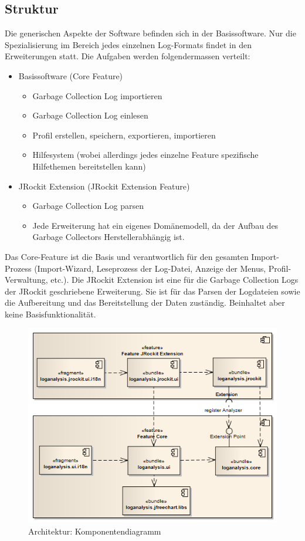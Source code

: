 \subsection{Struktur}\label{projektstruktur}
Die generischen Aspekte der Software befinden sich in der Basissoftware. Nur die Spezialisierung im Bereich jedes einzelnen Log-Formats findet in den Erweiterungen statt. Die Aufgaben werden folgendermassen verteilt:
\begin{itemize}
	\item Basissoftware (Core Feature)
		\begin{itemize}
			\item Garbage Collection Log importieren
			\item Garbage Collection Log einlesen
			\item Profil erstellen, speichern, exportieren, importieren
			\item Hilfesystem (wobei allerdings jedes einzelne Feature spezifische Hilfethemen bereitstellen kann)
		\end{itemize}
	\item JRockit Extension (JRockit Extension Feature)
		\begin{itemize}
			\item Garbage Collection Log parsen
			\item Jede Erweiterung hat ein eigenes Domänemodell, da der Aufbau des Garbage Collectors Herstellerabhängig ist.
		\end{itemize}
\end{itemize}

Das Core-Feature ist die Basis und verantwortlich für den gesamten Import-Prozess (Import-Wizard, Leseprozess der Log-Datei, Anzeige der Menus, Profil-Verwaltung, etc.). Die JRockit Extension ist eine für die Garbage Collection Logs der JRockit geschriebene Erweiterung. Sie ist für das Parsen der Logdateien sowie die Aufbereitung und das Bereitstellung der Daten zuständig. Beinhaltet aber keine Basisfunktionalität.
 \begin{figure}[H]
  	\centering
    	\includegraphics[width=14cm]{images/architektur_komponenten_uebersicht}
        	\caption{Architektur: Komponentendiagramm}
\end{figure}

